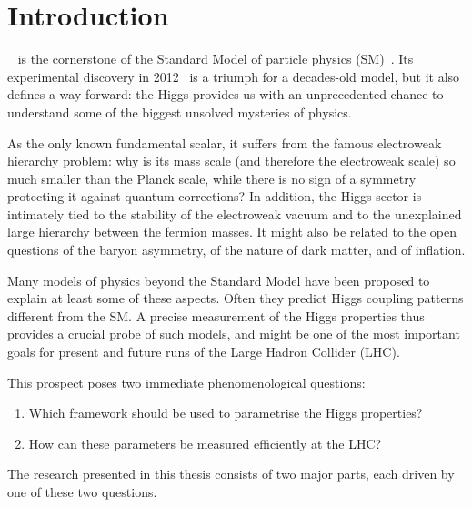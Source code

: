 

\chapter{Introduction}
\label{chapter:Introduction}

~\cite{Higgs:1964ia, Higgs:1964pj,
  Englert:1964et, Guralnik:1964eu, Higgs:1966ev} is the cornerstone
of the Standard Model of particle physics (SM)~\cite{Glashow:1961tr,
  Weinberg:1967tq, Salam:1968rm}. Its experimental discovery in
2012~\cite{Aad:2012tfa, Chatrchyan:2012xdj}
%
%
%
is a triumph for a decades-old model, but it also defines a way
forward: the Higgs provides us with an unprecedented chance to
understand some of the biggest unsolved mysteries of physics.

As the only known fundamental scalar, it suffers from the famous
electroweak hierarchy problem: why is its mass scale (and therefore
the electroweak scale) so much smaller than the Planck scale, while
there is no sign of a symmetry protecting it against quantum
corrections? In addition, the Higgs sector is intimately tied to the
stability of the electroweak vacuum and to the unexplained large
hierarchy between the fermion masses. It might also be related to
the open questions of the baryon asymmetry, of the nature of dark
matter, and of inflation.

Many models of physics beyond the Standard Model have been proposed to
explain at least some of these aspects. Often they predict Higgs
coupling patterns different from the SM. A precise measurement of
the Higgs properties thus provides a crucial probe of such models, and
might be one of the most important goals for present and future
runs of the Large Hadron Collider (LHC).

This prospect poses two immediate phenomenological questions:
%
\begin{enumerate}
\item Which framework should be used to parametrise the Higgs
  properties?
\item How can these parameters be measured efficiently at the LHC?
\end{enumerate}
%
%
The research presented in this thesis consists of two major parts,
each driven by one of these two questions.
%

